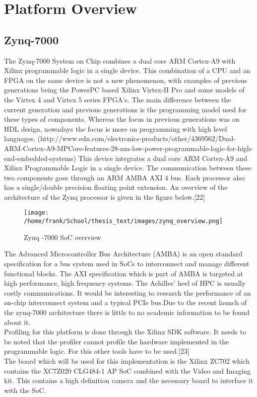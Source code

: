 


\chapter{Platform Overview}

\section{Zynq-7000}


The Zynq-7000 System on Chip combines a dual core ARM Cortex-A9 with Xilinx programmable logic in a single device. This combination of a CPU and an FPGA on the same device is not a new phenomenon, with examples of previous generations being the PowerPC based Xilinx Virtex-II Pro and some models of the Virtex 4 and Virtex 5 series FPGA's. The main difference between the current generation and previous generations is the programming model used for these types of components. Whereas the focus in previous generations was on HDL design, nowadays the focus is more on programming with high level languages. (http://www.edn.com/electronics-products/other/4369562/Dual-ARM-Cortex-A9-MPCore-features-28-nm-low-power-programmable-logic-for-high-end-embedded-systems)
This device integrates a dual core ARM Cortex-A9 and Xilinx Programmable Logic in a single device. The communication between these two components goes through an ARM AMBA AXI 4 bus. Each processor also has a single/double precision floating point extension. An overview of the architecture of the Zynq processor is given in the figure below.[22]

\begin{figure}[H]
\centering
\texttt{[image: /home/frank/School/thesis\_text/images/zynq\_overview.png]}
\caption{Zynq -7000 SoC overview}
\label{img:zynq_overview}
\end{figure}


The Advanced Microcontroller Bus Architecture (AMBA) is an open standard specification for a bus system used in SoCs to interconnect and manage different functional blocks. The AXI specification which is part of AMBA is targeted at high performance, high frequency systems. The Achilles' heel of HPC is usually costly communications. It would be interesting to research the performance of an on-chip interconnect system and a typical PCIe bus.Due to the recent launch of the zynq-7000 architecture there is little to no academic information to be found about it.\\
Profiling for this platform is done through the Xilinx SDK software. It needs to be noted that the profiler cannot profile the hardware implemented in the programmable logic. For this other tools have to be used.[23]\\
The board which will be used for this implementation is the Xilinx ZC702 which contains the XC7Z020 CLG484-1 AP SoC combined with the Video and Imaging kit. This contains a high definition camera and the necessary board to interface it with the SoC.

